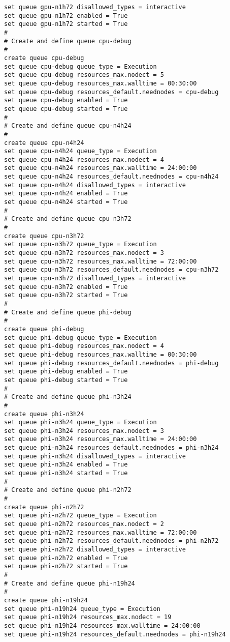 \begin{lstlisting}
set queue gpu-n1h72 disallowed_types = interactive
set queue gpu-n1h72 enabled = True
set queue gpu-n1h72 started = True
#
# Create and define queue cpu-debug
#
create queue cpu-debug
set queue cpu-debug queue_type = Execution
set queue cpu-debug resources_max.nodect = 5
set queue cpu-debug resources_max.walltime = 00:30:00
set queue cpu-debug resources_default.neednodes = cpu-debug
set queue cpu-debug enabled = True
set queue cpu-debug started = True
#
# Create and define queue cpu-n4h24
#
create queue cpu-n4h24
set queue cpu-n4h24 queue_type = Execution
set queue cpu-n4h24 resources_max.nodect = 4
set queue cpu-n4h24 resources_max.walltime = 24:00:00
set queue cpu-n4h24 resources_default.neednodes = cpu-n4h24
set queue cpu-n4h24 disallowed_types = interactive
set queue cpu-n4h24 enabled = True
set queue cpu-n4h24 started = True
#
# Create and define queue cpu-n3h72
#
create queue cpu-n3h72
set queue cpu-n3h72 queue_type = Execution
set queue cpu-n3h72 resources_max.nodect = 3
set queue cpu-n3h72 resources_max.walltime = 72:00:00
set queue cpu-n3h72 resources_default.neednodes = cpu-n3h72
set queue cpu-n3h72 disallowed_types = interactive
set queue cpu-n3h72 enabled = True
set queue cpu-n3h72 started = True
#
# Create and define queue phi-debug
#
create queue phi-debug
set queue phi-debug queue_type = Execution
set queue phi-debug resources_max.nodect = 4
set queue phi-debug resources_max.walltime = 00:30:00
set queue phi-debug resources_default.neednodes = phi-debug
set queue phi-debug enabled = True
set queue phi-debug started = True
#
# Create and define queue phi-n3h24
#
create queue phi-n3h24
set queue phi-n3h24 queue_type = Execution
set queue phi-n3h24 resources_max.nodect = 3
set queue phi-n3h24 resources_max.walltime = 24:00:00
set queue phi-n3h24 resources_default.neednodes = phi-n3h24
set queue phi-n3h24 disallowed_types = interactive
set queue phi-n3h24 enabled = True
set queue phi-n3h24 started = True
#
# Create and define queue phi-n2h72
#
create queue phi-n2h72
set queue phi-n2h72 queue_type = Execution
set queue phi-n2h72 resources_max.nodect = 2
set queue phi-n2h72 resources_max.walltime = 72:00:00
set queue phi-n2h72 resources_default.neednodes = phi-n2h72
set queue phi-n2h72 disallowed_types = interactive
set queue phi-n2h72 enabled = True
set queue phi-n2h72 started = True
#
# Create and define queue phi-n19h24
#
create queue phi-n19h24
set queue phi-n19h24 queue_type = Execution
set queue phi-n19h24 resources_max.nodect = 19
set queue phi-n19h24 resources_max.walltime = 24:00:00
set queue phi-n19h24 resources_default.neednodes = phi-n19h24

\end{lstlisting}
